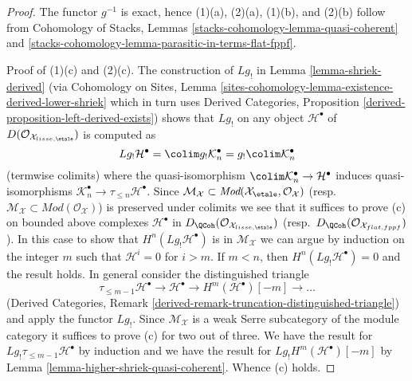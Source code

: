 \begin{proof}
The functor $g^{-1}$ is exact, hence (1)(a), (2)(a), (1)(b), and (2)(b)
follow from Cohomology of Stacks,
Lemmas \ref{stacks-cohomology-lemma-quasi-coherent} and
\ref{stacks-cohomology-lemma-parasitic-in-terms-flat-fppf}.

\medskip\noindent
Proof of (1)(c) and (2)(c).
The construction of $Lg_!$ in Lemma \ref{lemma-shriek-derived}
(via Cohomology on Sites,
Lemma \ref{sites-cohomology-lemma-existence-derived-lower-shriek}
which in turn uses
Derived Categories, Proposition \ref{derived-proposition-left-derived-exists})
shows that $Lg_!$ on any object $\mathcal{H}^\bullet$ of
$D(\mathcal{O}_{\mathcal{X}_{lisse,\etale}})$ is computed
as
$$
Lg_!\mathcal{H}^\bullet = \colim g_!\mathcal{K}_n^\bullet =
g_! \colim \mathcal{K}_n^\bullet
$$
(termwise colimits) where the quasi-isomorphism
$\colim \mathcal{K}_n^\bullet \to \mathcal{H}^\bullet$
induces quasi-isomorphisms
$\mathcal{K}_n^\bullet \to \tau_{\leq n} \mathcal{H}^\bullet$.
Since
$\mathcal{M}_\mathcal{X} \subset
\textit{Mod}(\mathcal{X}_\etale, \mathcal{O}_\mathcal{X})$
(resp.\ $\mathcal{M}_\mathcal{X} \subset \textit{Mod}(\mathcal{O}_\mathcal{X})$)
is preserved under colimits we see that it suffices to prove (c)
on bounded above complexes $\mathcal{H}^\bullet$ in
$D_\QCoh(\mathcal{O}_{\mathcal{X}_{lisse,\etale}})$
(resp.\ $D_\QCoh(\mathcal{O}_{\mathcal{X}_{flat,fppf}})$).
In this case to show that $H^n(Lg_!\mathcal{H}^\bullet)$ is
in $\mathcal{M}_\mathcal{X}$ we can argue by induction on the integer
$m$ such that $\mathcal{H}^i = 0$ for $i > m$. If $m < n$, then
$H^n(Lg_!\mathcal{H}^\bullet) = 0$ and the result holds. In general
consider the distinguished triangle
$$
\tau_{\leq m - 1}\mathcal{H}^\bullet \to \mathcal{H}^\bullet \to
H^m(\mathcal{H}^\bullet)[-m] \to \ldots
$$
(Derived Categories, Remark
\ref{derived-remark-truncation-distinguished-triangle})
and apply the functor $Lg_!$. Since $\mathcal{M}_\mathcal{X}$
is a weak Serre subcategory of the module category it suffices to
prove (c) for two out of three. We have the result for
$Lg_!\tau_{\leq m - 1}\mathcal{H}^\bullet$ by induction and we
have the result for $Lg_!H^m(\mathcal{H}^\bullet)[-m]$ by
Lemma \ref{lemma-higher-shriek-quasi-coherent}. Whence (c) holds.


\end{proof}
